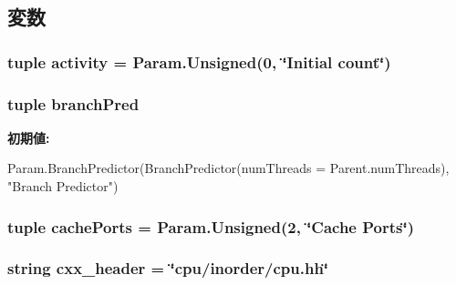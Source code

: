 \subsection{変数}
\hypertarget{classInOrderCPU_1_1InOrderCPU_a179708190406cb8098a70bbdfd73088c}{
\subsubsection[{activity}]{\setlength{\rightskip}{0pt plus 5cm}tuple {\bf activity} = Param.Unsigned(0, \char`\"{}Initial count\char`\"{})}}
\label{classInOrderCPU_1_1InOrderCPU_a179708190406cb8098a70bbdfd73088c}
\hypertarget{classInOrderCPU_1_1InOrderCPU_ac566dd90d96e45183abc6f54c960ffec}{
\subsubsection[{branchPred}]{\setlength{\rightskip}{0pt plus 5cm}tuple {\bf branchPred}}}
\label{classInOrderCPU_1_1InOrderCPU_ac566dd90d96e45183abc6f54c960ffec}
{\bfseries 初期値:}
\begin{DoxyCode}
Param.BranchPredictor(BranchPredictor(numThreads =
                                                       Parent.numThreads),
                                       "Branch Predictor")
\end{DoxyCode}
\hypertarget{classInOrderCPU_1_1InOrderCPU_a351bb34b2113c3ae4bd2449d92794d5a}{
\subsubsection[{cachePorts}]{\setlength{\rightskip}{0pt plus 5cm}tuple {\bf cachePorts} = Param.Unsigned(2, \char`\"{}Cache Ports\char`\"{})}}
\label{classInOrderCPU_1_1InOrderCPU_a351bb34b2113c3ae4bd2449d92794d5a}
\hypertarget{classInOrderCPU_1_1InOrderCPU_a17da7064bc5c518791f0c891eff05fda}{
\subsubsection[{cxx\_\-header}]{\setlength{\rightskip}{0pt plus 5cm}string {\bf cxx\_\-header} = \char`\"{}cpu/inorder/cpu.hh\char`\"{}}}

